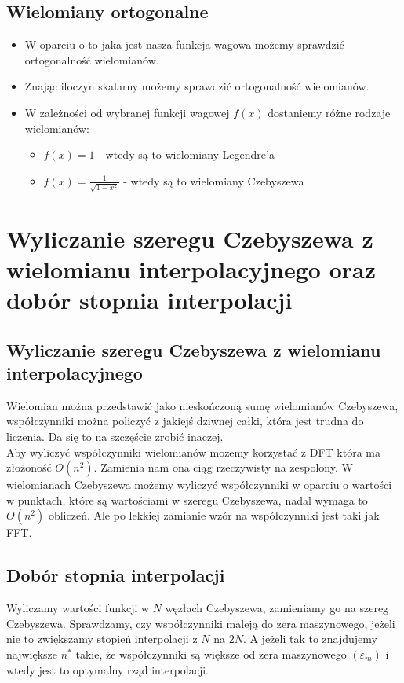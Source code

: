 \documentclass[a4paper]{article}
\begin{document}
\subsection{Wielomiany ortogonalne}
\begin{itemize}
    \item W oparciu o to jaka jest nasza funkcja wagowa możemy sprawdzić ortogonalność wielomianów.
    \item Znając iloczyn skalarny możemy sprawdzić ortogonalność wielomianów.
    \item W zależności od wybranej funkcji wagowej $f(x)$ dostaniemy różne rodzaje wielomianów:
    \begin{itemize}
        \item $f(x) = 1$ - wtedy są to wielomiany Legendre’a
        \item $f\left(x\right)=\frac{1}{\sqrt{1-x^2}}$ - wtedy są to wielomiany Czebyszewa
    \end{itemize}
\end{itemize}


\section{Wyliczanie szeregu Czebyszewa z wielomianu interpolacyjnego oraz dobór stopnia interpolacji}

\subsection{Wyliczanie szeregu Czebyszewa z wielomianu interpolacyjnego}
Wielomian można przedstawić jako nieskończoną sumę wielomianów Czebyszewa, współczynniki można policzyć z jakiejś dziwnej całki, która jest trudna do liczenia. Da się to na szczęście zrobić inaczej. \\
Aby wyliczyć współczynniki wielomianów możemy korzystać z DFT która ma złożoność $O(n^2)$. Zamienia nam ona ciąg rzeczywisty na zespolony. W wielomianach Czebyszewa możemy wyliczyć współczynniki w oparciu o wartości w punktach, które są wartościami w szeregu Czebyszewa, nadal wymaga to $O(n^2)$ obliczeń. Ale po lekkiej zamianie wzór na współczynniki jest taki jak FFT.

\subsection{Dobór stopnia interpolacji}
Wyliczamy wartości funkcji w $N$ węzłach Czebyszewa, zamieniamy go na szereg Czebyszewa. Sprawdzamy, czy współczynniki maleją do zera maszynowego, jeżeli nie to zwiększamy stopień interpolacji z $N$ na $2N$. A jeżeli tak to znajdujemy największe $n^*$ takie, że współczynniki są większe od zera maszynowego $(\varepsilon_m)$ i wtedy jest to optymalny rząd interpolacji.
\end{document}
